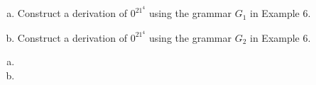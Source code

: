 \documentclass[../main.tex]{subfiles}
\begin{document}
\begin{enumerate}[a)]
	\item Construct a derivation of $0^21^4$ using the grammar $G_1$ in Example 6.
	\item Construct a derivation of $0^21^4$ using the grammar $G_2$ in Example 6.
\end{enumerate}

\solution
\begin{enumerate}[a)]
	\item 
	\item 
\end{enumerate}
\end{document}

